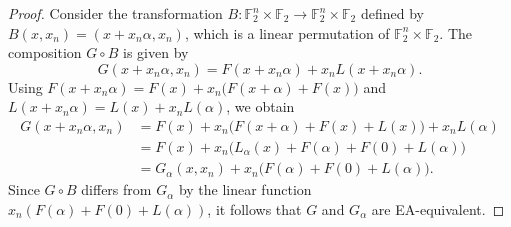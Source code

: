 \documentclass[10pt,a4paper]{amsart}
\def\F{\mathbb F}
\begin{document}
\begin{proof}
    Consider the transformation $B\colon \F_2^n \times \F_2 \to \F_2^n \times \F_2$ defined by $B(x, x_n) = (x + x_n \alpha, x_n)$, which is a linear permutation of $\F_2^n \times \F_2$.
    The composition $G \circ B$ is given by
    $$ G(x + x_n \alpha, x_n) = F(x + x_n \alpha) + x_n L(x + x_n \alpha). $$
    Using $F(x + x_n \alpha) = F(x) + x_n\big(F(x+\alpha) + F(x)\big)$ and $L(x + x_n \alpha) = L(x) + x_n L(\alpha)$, we obtain
    \begin{align*}
        G(x + x_n \alpha, x_n) 
        &= F(x) + x_n\big(F(x+\alpha) + F(x) + L(x)\big) + x_n L(\alpha) \\
        &= F(x) + x_n\big(L_\alpha(x) + F(\alpha) + F(0) + L(\alpha)\big) \\
        &= G_\alpha(x, x_n) + x_n\big(F(\alpha) + F(0) + L(\alpha)\big).
    \end{align*}
    Since $G \circ B$ differs from $G_\alpha$ by the linear function $x_n(F(\alpha) + F(0) + L(\alpha))$, it follows that $G$ and $G_\alpha$ are EA-equivalent.
\end{proof}
\end{document}

